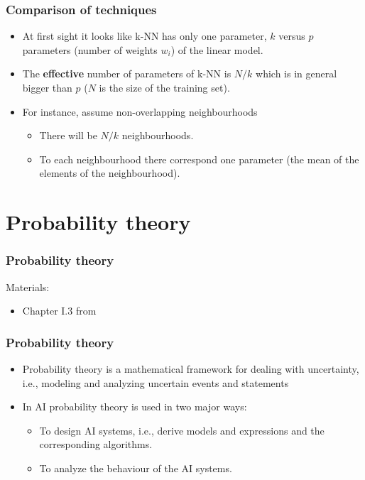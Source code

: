 \documentclass[notes]{beamer}          %
\begin{document}
\begin{frame}
\frametitle{Comparison of techniques}

    \begin{itemize}
        \item At first sight it looks like k-NN has only one parameter, $k$ versus $p$ parameters (number of weights $w_i$) of the linear model.
        \item The {\bf effective}  number of parameters of k-NN is $N/k$ which is in general bigger than $p$ ($N$ is the size of the training set).
        \item For instance, assume non-overlapping neighbourhoods
            \begin{itemize}
                \item There will be $N/k$ neighbourhoods.
                \item To each neighbourhood there correspond one parameter (the mean of the elements of the neighbourhood).
            \end{itemize}
    \end{itemize}

\end{frame}


\section{Probability theory}


\begin{frame}
\frametitle{Probability theory}
Materials:
\begin{itemize}
    \item Chapter I.3 from \cite{deeplearning}
\end{itemize}
\end{frame}

\begin{frame}
\frametitle{Probability theory}
\begin{itemize}
    \item Probability theory is a mathematical framework for dealing with uncertainty, i.e., modeling and analyzing uncertain events and statements
    \item In AI probability theory is used in two major ways:
        \begin{itemize}
            \item To design AI systems, i.e., derive models and expressions and the corresponding algorithms.
            \item To analyze the behaviour of the AI systems.
        \end{itemize}

\end{itemize}

\end{frame}
\end{document}
